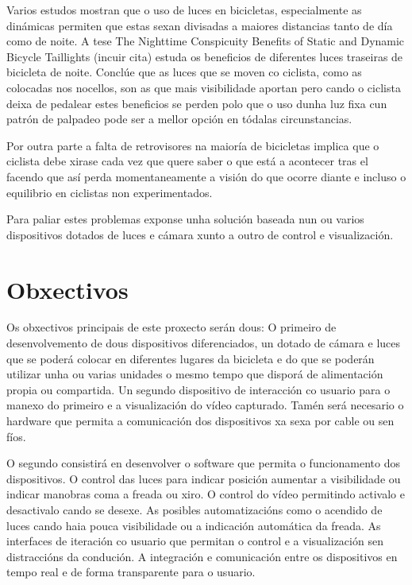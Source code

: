 Varios estudos mostran que o uso de luces en bicicletas, especialmente as dinámicas permiten que estas sexan divisadas a maiores distancias tanto de día como de noite. A tese The Nighttime Conspicuity Benefits of Static and Dynamic Bicycle Taillights (incuir cita) estuda os beneficios de diferentes luces traseiras de bicicleta de noite. Conclúe que as luces que se moven co ciclista, como as colocadas nos nocellos, son as que mais visibilidade aportan pero cando o ciclista  deixa de pedalear estes beneficios se perden polo que o uso dunha luz fixa cun patrón de palpadeo pode ser a mellor opción en tódalas circunstancias.

Por outra parte a falta de retrovisores na maioría de bicicletas implica que o ciclista debe xirase cada vez que quere saber o que está a acontecer tras el facendo que así perda momentaneamente a visión do que ocorre diante e incluso o equilibrio en ciclistas non experimentados.

Para paliar estes problemas exponse unha solución baseada nun ou varios dispositivos dotados de luces e cámara xunto a outro de control e visualización.


\section{Obxectivos}
\label{sec:obxectivos}
Os obxectivos principais de este proxecto serán dous:
O primeiro de desenvolvemento de dous dispositivos diferenciados, un dotado de cámara e luces que se poderá colocar en diferentes lugares da bicicleta e do que se poderán utilizar unha ou varias unidades o mesmo tempo que disporá de alimentación propia ou compartida. Un segundo dispositivo de interacción co usuario para o manexo do primeiro e a visualización do vídeo capturado. Tamén será necesario o hardware que permita a comunicación dos dispositivos xa sexa por cable ou sen fíos.

O segundo consistirá en desenvolver o software que permita o funcionamento dos dispositivos. O control das luces para indicar posición aumentar a visibilidade ou indicar manobras coma a freada ou xiro. O control do vídeo permitindo activalo e desactivalo cando se desexe. As posibles automatizacións como o acendido de luces cando haia pouca visibilidade ou a indicación automática da freada. As interfaces de iteración co usuario que permitan o control e a visualización sen distraccións da condución. A integración e comunicación entre os dispositivos en tempo real e de forma transparente para o usuario.

